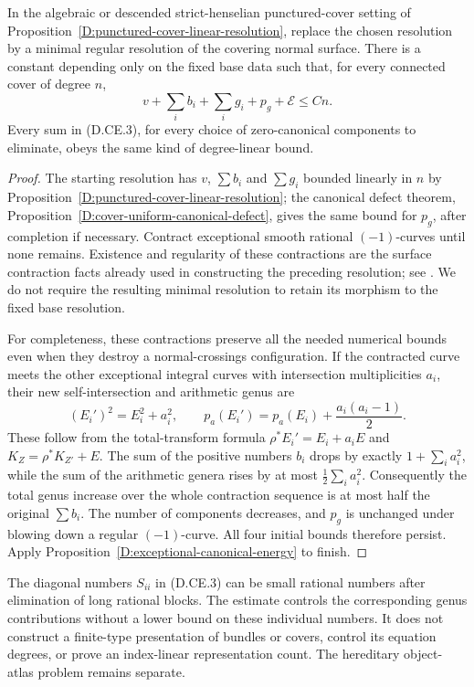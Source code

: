 \begin{corollary}
\label{D:punctured-cover-linear-energy}
In the algebraic or descended strict-henselian punctured-cover setting
of Proposition~\ref{D:punctured-cover-linear-resolution}, replace the
chosen resolution by a minimal regular resolution of the covering
normal surface. There is a constant depending only on the fixed base
data such that, for every connected cover of degree $n$,
\[
 v+\sum_i b_i+\sum_i g_i+p_g+\mathcal E\le Cn.          \tag{D.CE.6}
\]
Every sum in (D.CE.3), for every choice of zero-canonical components
to eliminate, obeys the same kind of degree-linear bound.
\end{corollary}
\begin{proof}
The starting resolution has $v$, $\sum b_i$ and $\sum g_i$
bounded linearly in $n$ by
Proposition~\ref{D:punctured-cover-linear-resolution}; the canonical
defect theorem, Proposition~\ref{D:cover-uniform-canonical-defect},
gives the same bound for $p_g$, after completion if necessary.
Contract exceptional smooth rational $(-1)$-curves until none remains.
Existence and regularity of these contractions are the surface
contraction facts already used in constructing the preceding
resolution; see \citet[Lemma 54.16.8, Tag 0C2M]
{StacksDSurfaceResolution}. We do not require the resulting minimal
resolution to retain its morphism to the fixed base resolution.

For completeness, these contractions preserve all the needed
numerical bounds even when they destroy a normal-crossings
configuration. If the contracted curve meets the other exceptional
integral curves with intersection multiplicities $a_i$, their new
self-intersection and arithmetic genus are
\[
 (E_i')^2=E_i^2+a_i^2,
 \qquad p_a(E_i')=p_a(E_i)+\frac{a_i(a_i-1)}{2}.          \tag{D.CE.7}
\]
These follow from the total-transform formula
$\rho^*E_i'=E_i+a_iE$ and $K_Z=\rho^*K_{Z'}+E$.
The sum of the positive numbers $b_i$ drops by exactly
$1+\sum_i a_i^2$, while the sum of the arithmetic genera rises
by at most $\frac12\sum_i a_i^2$. Consequently the total genus
increase over the whole contraction sequence is at most half
the original $\sum b_i$. The number of components decreases,
and $p_g$ is unchanged under blowing down a regular $(-1)$-curve.
All four initial bounds therefore persist. Apply
Proposition~\ref{D:exceptional-canonical-energy} to finish.
\end{proof}

\begin{remark}
The diagonal numbers $S_{ii}$ in (D.CE.3) can be small rational
numbers after elimination of long rational blocks. The estimate
controls the corresponding genus contributions without a lower
bound on these individual numbers. It does not construct a
finite-type presentation of bundles or covers, control its
equation degrees, or prove an index-linear representation count.
The hereditary object-atlas problem remains separate.
\end{remark}
